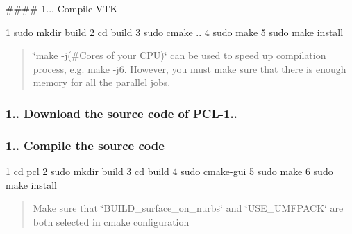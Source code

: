 \#\#\#\# 1... Compile V\+TK 
\begin{DoxyCode}
1 sudo mkdir build
2 cd build
3 sudo cmake ..
4 sudo make
5 sudo make install
\end{DoxyCode}


\begin{quote}
\char`\"{}make -\/j(\#\+Cores of your C\+P\+U)\char`\"{} can be used to speed up compilation process, e.\+g. make -\/j6. However, you must make sure that there is enough memory for all the parallel jobs. \end{quote}




\subsubsection*{1.. Download the source code of P\+C\+L-\/1..}





\subsubsection*{1.. Compile the source code}


\begin{DoxyCode}
1 cd pcl
2 sudo mkdir build
3 cd build
4 sudo cmake-gui
5 sudo make
6 sudo make install
\end{DoxyCode}


\begin{quote}
Make sure that \char`\"{}\+B\+U\+I\+L\+D\+\_\+surface\+\_\+on\+\_\+nurbs\char`\"{} and \char`\"{}\+U\+S\+E\+\_\+\+U\+M\+F\+P\+A\+C\+K\char`\"{} are both selected in cmake configuration\end{quote}

